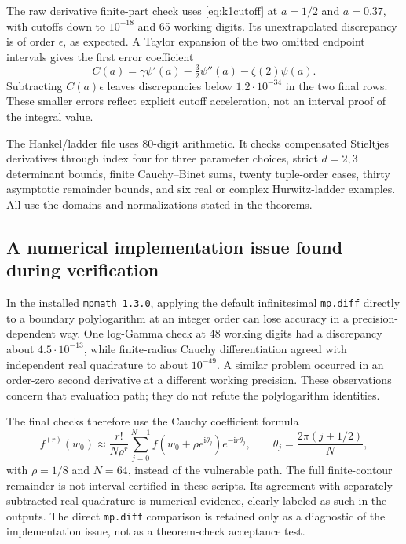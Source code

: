 \documentclass[11pt]{article}
\numberwithin{equation}{section}
\theoremstyle{definition}\newtheorem{definition}[theorem]{Definition}
\theoremstyle{remark}\newtheorem{remark}[theorem]{Remark}
\newcommand{\iu}{\mathrm i}
\begin{document}
The raw derivative finite-part check uses \eqref{eq:k1cutoff} at
$a=1/2$ and $a=0.37$, with cutoffs down to $10^{-18}$ and 65 working
digits. Its unextrapolated discrepancy is of order $\epsilon$, as
expected. A Taylor expansion of the two omitted endpoint intervals gives
the first error coefficient
\[
 C(a)=\gamma\psi'(a)-\tfrac32\psi''(a)-\zeta(2)\psi(a).
\]
Subtracting $C(a)\epsilon$ leaves discrepancies below $1.2\cdot10^{-34}$
in the two final rows. These smaller errors reflect explicit cutoff
acceleration, not an interval proof of the integral value.

The Hankel/ladder file uses 80-digit arithmetic. It checks compensated
Stieltjes derivatives through index four for three parameter choices,
strict $d=2,3$ determinant bounds, finite Cauchy--Binet sums, twenty
tuple-order cases, thirty asymptotic remainder bounds, and six real or
complex Hurwitz-ladder examples. All use the domains and normalizations
stated in the theorems.

\subsection{A numerical implementation issue found during verification}

In the installed \texttt{mpmath 1.3.0}, applying the default infinitesimal
\texttt{mp.diff} directly to a boundary polylogarithm at an integer
order can lose accuracy in a precision-dependent way. One log-Gamma
check at 48 working digits had a discrepancy about $4.5\cdot10^{-13}$,
while finite-radius Cauchy differentiation agreed with independent real
quadrature to about $10^{-49}$. A similar problem occurred in an
order-zero second derivative at a different working precision. These
observations concern that evaluation path; they do not refute the
polylogarithm identities.

The final checks therefore use the Cauchy coefficient formula
\begin{equation}\label{eq:Cauchydiagnostic}
 f^{(r)}(w_0)\approx
 \frac{r!}{N\rho^r}\sum_{j=0}^{N-1}
 f(w_0+\rho e^{\iu\theta_j})e^{-\iu r\theta_j},
 \qquad\theta_j=\frac{2\pi(j+1/2)}N,
\end{equation}
with $\rho=1/8$ and $N=64$, instead of the vulnerable path. The full
finite-contour remainder is not interval-certified in these scripts.
Its agreement with separately subtracted real quadrature is numerical
evidence, clearly labeled as such in the outputs. The direct
\texttt{mp.diff} comparison is retained only as a diagnostic of the
implementation issue, not as a theorem-check acceptance test.
\end{document}
